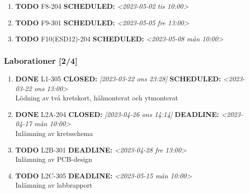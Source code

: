 \documentclass[11pt]{article}
\begin{document}
\begin{enumerate}
\item {\bfseries\sffamily TODO} F8-204
\label{sec:orgc0598ce}
\noindent\textbf{SCHEDULED:} \textit{<2023-05-02 tis 10:00>}\\[0pt]
\item {\bfseries\sffamily TODO} F9-301
\label{sec:org4d4cdc8}
\noindent\textbf{SCHEDULED:} \textit{<2023-05-05 fre 13:00>}\\[0pt]
\item {\bfseries\sffamily TODO} F10(ESD12)-204
\label{sec:org0d84add}
\noindent\textbf{SCHEDULED:} \textit{<2023-05-08 mån 10:00>}\\[0pt]
\end{enumerate}

\subsubsection{Laborationer [2/4]}
\label{sec:orge06d8fd}
\begin{enumerate}
\item {\bfseries\sffamily DONE} L1-305
\label{sec:orgffb8e6b}
\noindent\textbf{CLOSED:} \textit{[2023-03-22 ons 23:28] } \textbf{SCHEDULED:} \textit{<2023-03-22 ons 13:00>}\\[0pt]
Lödning av två kretskort, hålmonterat och ytmonterat

\item {\bfseries\sffamily DONE} L2A-204
\label{sec:org4e76bed}
\noindent\textbf{CLOSED:} \textit{[2023-04-26 ons 14:14] } \textbf{DEADLINE:} \textit{<2023-04-17 mån 10:00>}\\[0pt]
Inlämning av kretsschema

\item {\bfseries\sffamily TODO} L2B-301
\label{sec:orgc8e5d3a}
\noindent\textbf{DEADLINE:} \textit{<2023-04-28 fre 13:00>}\\[0pt]
Inlämning av PCB-design

\item {\bfseries\sffamily TODO} L2C-305
\label{sec:orge2365dd}
\noindent\textbf{DEADLINE:} \textit{<2023-05-15 mån 10:00>}\\[0pt]
Inlämning av labbrapport
\end{enumerate}
\end{document}

